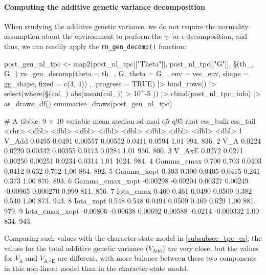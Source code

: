 \documentclass[a4paper,12pt,twoside]{article}
\begin{document}
\paragraph{Computing the additive genetic variance decomposition}
When studying the additive genetic variance, we do not require the normality assumption about the environment to perform the $\gamma$- or $\iota$-decomposition, and thus, we can readily apply the \texttt{rn\_gen\_decomp()} function:
\begin{Rinput}
post_gen_nl_tpc <-
    map2(post_nl_tpc[["Theta"]], post_nl_tpc[["G"]],
         \§§(th_, G_) { rn_gen_decomp(theta    = th_,
                                    G_theta  = G_,
                                    env      = vec_env,
                                    shape    = gg_shape,
                                    fixed    = c(3, 4)) },
         .progress = TRUE) |>
    bind_rows() |>
    select(where(\§§(col_) { abs(mean(col_)) > 10^-5 })) |>
    cbind(post_nl_tpc_info) |>
    as_draws_df()
summarise_draws(post_gen_nl_tpc)
\end{Rinput}
\begin{Routput}
# A tibble: 9 × 10
  variable            mean   median      sd     mad       q5       q95  rhat ess_bulk ess_tail
  <chr>              <dbl>    <dbl>   <dbl>   <dbl>    <dbl>     <dbl> <dbl>    <dbl>    <dbl>
1 V_Add            0.0495   0.0491  0.00557 0.00552  0.0411   0.0594   1.01      994.     836.
2 V_A              0.0224   0.0220  0.00342 0.00355  0.0173   0.0284   1.01      936.     800.
3 V_AxE            0.0272   0.0271  0.00250 0.00251  0.0234   0.0314   1.01     1024.     984.
4 Gamma_cmax       0.700    0.703   0.0403  0.0412   0.632    0.762    1.00      864.     892.
5 Gamma_xopt       0.303    0.300   0.0405  0.0415   0.241    0.373    1.00      870.     893.
6 Gamma_cmax_xopt -0.00298 -0.00204 0.00327 0.00249 -0.00965  0.000270 0.999     811.     856.
7 Iota_cmax        0.460    0.461   0.0490  0.0509   0.382    0.540    1.00      873.     943.
8 Iota_xopt        0.548    0.548   0.0494  0.0509   0.469    0.629    1.00      881.     979.
9 Iota_cmax_xopt  -0.00806 -0.00638 0.00692 0.00588 -0.0214  -0.000332 1.00      834.     943.
\end{Routput}
Comparing such values with the character-state model in \autoref{subsubsec_tpc_cs}, the values for the total additive genetic variance ($V_{\text{Add}}$) are very close, but the values for $V_{\text{A}}$ and $V_{\text{A}\times\text{E}}$ are different, with more balance between these two components in this non-linear model than in the character-state model.
\end{document}
